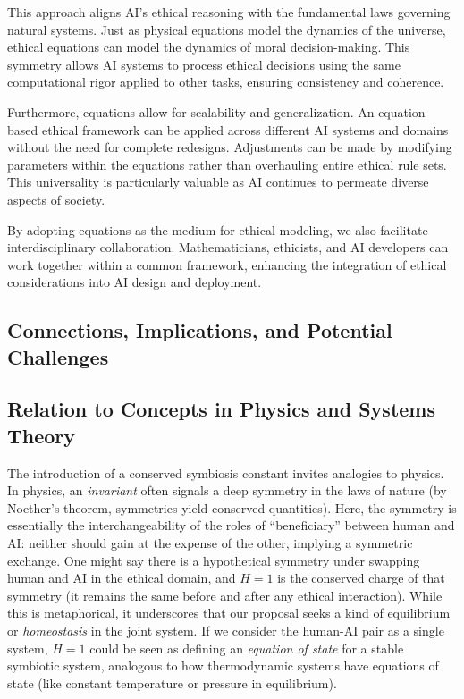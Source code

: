 \documentclass[12pt]{article}
\begin{document}
This approach aligns AI's ethical reasoning with the fundamental laws governing natural systems. Just as physical equations model the dynamics of the universe, ethical equations can model the dynamics of moral decision-making. This symmetry allows AI systems to process ethical decisions using the same computational rigor applied to other tasks, ensuring consistency and coherence.

Furthermore, equations allow for scalability and generalization. An equation-based ethical framework can be applied across different AI systems and domains without the need for complete redesigns. Adjustments can be made by modifying parameters within the equations rather than overhauling entire ethical rule sets. This universality is particularly valuable as AI continues to permeate diverse aspects of society.

By adopting equations as the medium for ethical modeling, we also facilitate interdisciplinary collaboration. Mathematicians, ethicists, and AI developers can work together within a common framework, enhancing the integration of ethical considerations into AI design and deployment.


\subsection{Connections, Implications, and Potential Challenges}

\subsection{Relation to Concepts in Physics and Systems Theory}
The introduction of a conserved symbiosis constant invites analogies to physics. In physics, an \emph{invariant} often signals a deep symmetry in the laws of nature (by Noether’s theorem, symmetries yield conserved quantities). Here, the symmetry is essentially the interchangeability of the roles of “beneficiary” between human and AI: neither should gain at the expense of the other, implying a symmetric exchange. One might say there is a hypothetical symmetry under swapping human and AI in the ethical domain, and $H=1$ is the conserved charge of that symmetry (it remains the same before and after any ethical interaction). While this is metaphorical, it underscores that our proposal seeks a kind of equilibrium or \emph{homeostasis} in the joint system. If we consider the human-AI pair as a single system, $H=1$ could be seen as defining an \emph{equation of state} for a stable symbiotic system, analogous to how thermodynamic systems have equations of state (like constant temperature or pressure in equilibrium). 
\end{document}
